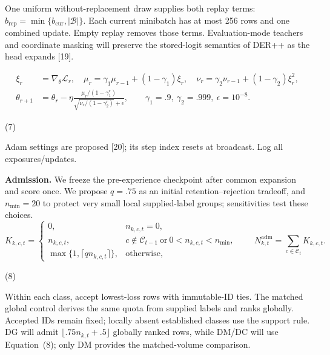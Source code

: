 \documentclass[10pt,a4paper]{article}
\begin{document}
One uniform without-replacement draw supplies both replay terms: $b_{\mathrm{rep}}=\min\{b_{\mathrm{cur}},|\mathcal B|\}$. Each current minibatch has at most 256 rows and one combined update. Empty replay removes those terms. Evaluation-mode teachers and coordinate masking will preserve the stored-logit semantics of DER++ as the head expands [19].

\begin{equation}
\begin{aligned}
\xi_r&=\nabla_\theta\mathcal L_r,\quad\mu_r=\gamma_1\mu_{r-1}+(1-\gamma_1)\xi_r,\quad
\nu_r=\gamma_2\nu_{r-1}+(1-\gamma_2)\xi_r^2,\\
\theta_{r+1}&=\theta_r-\eta\frac{\mu_r/(1-\gamma_1^r)}{\sqrt{\nu_r/(1-\gamma_2^r)}+\epsilon},\qquad
\gamma_1=.9,\ \gamma_2=.999,\ \epsilon=10^{-8}.
\end{aligned}

\end{equation}
\par\hfill(7)\par

Adam settings are proposed [20]; its step index resets at broadcast. Log all exposures/updates.

\textbf{Admission.} We freeze the pre-experience checkpoint after common expansion and score once. We propose $q=.75$ as an initial retention--rejection tradeoff, and $n_{\min}=20$ to protect very small local supplied-label groups; sensitivities test these choices.
\begin{equation}
K_{k,c,t}=\begin{cases}
0,&n_{k,c,t}=0,\\
n_{k,c,t},&c\notin\mathcal C_{t-1}\ \text{or}\ 0<n_{k,c,t}<n_{\min},\\
\max\{1,\lceil qn_{k,c,t}\rceil\},&\text{otherwise},
\end{cases}\qquad N^{\mathrm{adm}}_{k,t}=\sum_{c\in\mathcal C_t}K_{k,c,t}.

\end{equation}
\par\hfill(8)\par

Within each class, accept lowest-loss rows with immutable-ID ties. The matched global control derives the same quota from supplied labels and ranks globally. Accepted IDs remain fixed; locally absent established classes use the support rule. DG will admit $\lfloor .75n_{k,t}+.5\rfloor$ globally ranked rows, while DM/DC will use Equation~(8); only DM provides the matched-volume comparison.
\end{document}
